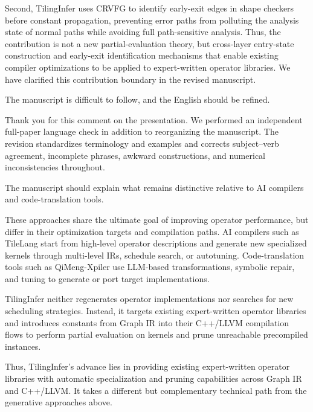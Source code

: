 Second, TilingInfer uses CRVFG to identify early-exit edges in shape checkers
before constant propagation, preventing error paths from polluting the analysis
state of normal paths while avoiding full path-sensitive analysis.  Thus, the
contribution is not a new partial-evaluation theory, but cross-layer entry-state
construction and early-exit identification mechanisms that enable existing
compiler optimizations to be applied to expert-written operator libraries.  We
have clarified this contribution boundary in the revised manuscript.


{The manuscript is difficult to follow, and the English should be refined.}

\authorresponse
Thank you for this comment on the presentation.  We performed an independent
full-paper language check in addition to reorganizing the manuscript.  The
revision standardizes terminology and examples and corrects subject--verb
agreement, incomplete phrases, awkward constructions, and numerical
inconsistencies throughout.


{The manuscript should explain what remains distinctive relative to AI
compilers and code-translation tools.}

\authorresponse
These approaches share the ultimate goal of improving operator performance, but
differ in their optimization targets and compilation paths.  AI compilers such
as TileLang start from high-level operator descriptions and generate new
specialized kernels through multi-level IRs, schedule search, or autotuning.
Code-translation tools such as QiMeng-Xpiler use LLM-based transformations,
symbolic repair, and tuning to generate or port target implementations.

TilingInfer neither regenerates operator implementations nor searches for new
scheduling strategies.  Instead, it targets existing expert-written operator
libraries and introduces constants from Graph IR into their C++/LLVM
compilation flows to perform partial evaluation on kernels and prune unreachable
precompiled instances.

Thus, TilingInfer's advance lies in providing existing expert-written operator
libraries with automatic specialization and pruning capabilities across Graph
IR and C++/LLVM.  It takes a different but complementary technical path from
the generative approaches above.

